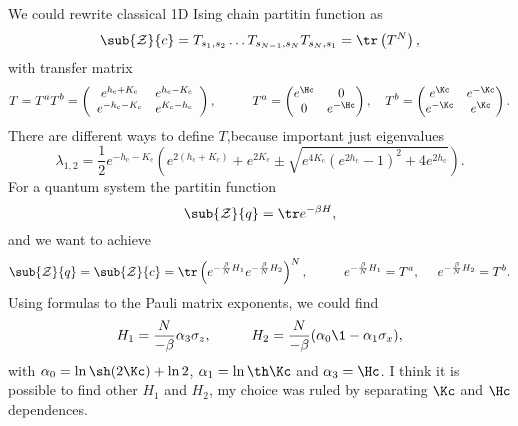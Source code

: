 

We could rewrite classical 1D Ising chain partitin function as
\begin{equation*}
	\sub{\mathcal{Z}}{c} = T_{s_1,s_2} \ldots T_{s_{N-1},s_{N}} T_{s_N, s_1} = \tr\left(T^N\right),
\end{equation*}
with transfer matrix
\begin{equation*}
	T = T^a T^b = \left(
\begin{array}{cc}
 e^{h_\text{c}+K_\text{c}} & e^{h_\text{c}-K_\text{c}} \\
 e^{-h_\text{c}-K_\text{c}} & e^{K_\text{c}-h_\text{c}} \\
\end{array}
\right),
	\hspace{10mm}
	T^a = \begin{pmatrix}
	    e^{\Hc} & 0 \\
	    0 & e^{-\Hc} \\
	\end{pmatrix} 
	,\ \ \ 
	T^{b} = \begin{pmatrix}
	    e^{\Kc } & e^{-\Kc } \\
	    e^{-\Kc } & e^{\Kc } \\
	\end{pmatrix}.
\end{equation*}
There are different ways to define $T$,because important just eigenvalues
\begin{equation*}
	\lambda_{1,2} = \frac{1}{2} e^{-h_{\text{c}}-K_{\text{c}}} \left(e^{2 \left(h_{\text{c}}+K_{\text{c}}\right)}+e^{2 K_{\text{c}}} \pm \sqrt{ e^{4 K_{\text{c}}} \left(e^{2 h_{\text{c}}}-1\right)^2 +4 e^{2 h_{\text{c}}}}\right).
\end{equation*}
For a quantum system the partitin function 
\begin{equation*}
	\sub{\mathcal{Z}}{q} = \tr e^{-\beta H},
\end{equation*}
and we want to achieve
\begin{equation*}
	\sub{\mathcal{Z}}{q} = \sub{\mathcal{Z}}{c} = \tr\left(
		e^{-\frac{\beta}{N}H_1} e^{-\frac{\beta}{N}H_2}
	\right)^N,
	\hspace{10 mm} 
	e^{- \frac{\beta}{N} H_1} = T^a,
	\hspace{5 mm} 
	e^{- \frac{\beta}{N} H_2} = T^b.
\end{equation*}
Using formulas to the Pauli matrix exponents, we could find
\begin{equation*}
	H_1 = \frac{N}{-\beta} \alpha_3 \sigma_z,
	\hspace{10 mm} 
	H_2 = \frac{N}{-\beta} (\alpha_0 \1 - \alpha_1 \sigma_x),
\end{equation*}
with $\alpha_0 = \ln \sh(2 \Kc) + \ln 2$, $\alpha_1 = \ln \th \Kc$ and $\alpha_3 = \Hc$. I think it is possible to find other $H_1$ and $H_2$, my choice was ruled by separating $\Kc$ and $\Hc$ dependences.

